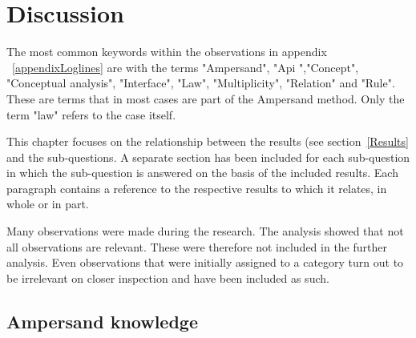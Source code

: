 \newpage
\section{Discussion} \label{section:discussion}

The most common keywords within the observations in appendix ~\ref{appendixLoglines} are with the terms "Ampersand", "Api ","Concept", "Conceptual analysis",
"Interface", "Law", "Multiplicity", "Relation" and "Rule".
These are terms that in most cases are part of the Ampersand method.
Only the term "law" refers to the case itself.

This chapter focuses on the relationship between the results (see section~\ref{Results} and the sub-questions.
A separate section has been included for each sub-question in which the sub-question is answered on the basis of the included results.
Each paragraph contains a reference to the respective results to which it relates, in whole or in part.

Many observations were made during the research.
The analysis showed that not all observations are relevant.
These were therefore not included in the further analysis.
Even observations that were initially assigned to a category turn out to be irrelevant on closer inspection and have been included as such.

\subsection{Ampersand knowledge}\label{subsection:ampersand-knowledge}

